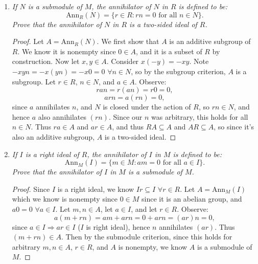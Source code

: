 \documentclass[9pt,reqno,twoside]{amsbook}
\theoremstyle{plain}
\numberwithin{section}{chapter}
\numberwithin{equation}{chapter}
\theoremstyle{definition}
\theoremstyle{remark}
\theoremstyle{plain}
\newcommand{\sub}{\subseteq}
\begin{document}
\begin{enumerate}[label=\arabic*.]
\begin{enumerate}
\vspace{3mm}
\item \textit{If $R$ has zero divisors, show that every nonzero $R$-module has nonzero torsion elements. }

\begin{proof}
Suppose $R$ has zero divisors. So $\exists r,s \in R$ nonzero such that $rs = 0$. Now let $M$ be an $R$-module. We wish to show that $\exists m \in M$ s.t. $m \neq 0$, $tm = 0$ for some nonzero $t \in R$. Let $n \in M$ s.t. $n \neq 0$. Now consider $sn \in M$ and $r \in R$. Now note that $rsn = 0$ and that $r$ and $sn$ are both nonzero, so $sn$ is a nonzero torsion element. 
\end{proof}
\end{enumerate}
\vspace{3mm}
\item \textit{If $N$ is a submodule of $M$, the annihilator of $N$ in $R$ is defined to be: 
$$
\text{Ann}_R(N) = \{r \in R:rn = 0 \text{ for all }n \in N\}.
$$
Prove that the annihilator of $N$ in $R$ is a two-sided ideal of $R$. 
}

\begin{proof}
Let $A = \text{Ann}_R(N)$. We first show that $A$ is an additive subgroup of $R$. We know it is nonempty since $0 \in A$, and it is a subset of $R$ by construction. Now let $x,y \in A$. Consider $x(-y) = -xy$. Note $-xyn = -x(yn) = -x0 = 0$ $\forall n \in N$, so by the subgroup criterion, $A$ is a subgroup. Let $r \in R$, $n \in N$, and $a \in A$. Observe:
$$
ran = r(an) = r0 = 0,
$$
$$
arn = a(rn) = 0,
$$
since $a$ annihilates $n$, and $N$ is closed under the action of $R$, so $rn \in N$, and hence $a$ also annihilates $(rn)$. Since our $n$ was arbitrary, this holds for all $n \in N$. Thus $ra \in A$ and $ar \in A$, and thus $RA \sub A$ and $AR \sub A$, so since it's also an additive subgroup, $A$ is a two-sided ideal. 
\end{proof}

\vspace{3mm}

\item \textit{If $I$ is a right ideal of $R$, the annihilator of $I$ in $M$ is defined to be: 
$$
\text{Ann}_M(I) = \{m \in M:am = 0 \text{ for all }a \in I\}.
$$
Prove that the annihilator of $I$ in $M$ is a submodule of $M$. 
}
\begin{proof}
Since $I$ is a right ideal, we know $Ir \sub I$ $\forall r \in R$. Let $A = \text{Ann}_M(I)$ which we know is nonempty since $0 \in M$ since it is an abelian group, and $a0 = 0$ $\forall a \in I$. Let $m,n \in A$, let $a \in I$, and let $r \in R$. Observe: 
$$
a(m + rn) = am + arn = 0 + arn = (ar)n = 0,
$$
since $a \in I \Rightarrow ar \in I$ ($I$ is right ideal), hence $n$ annihilates $(ar)$. Thus $(m + rn) \in A$. Then by the submodule criterion, since this holds for arbitrary $m,n  \in A$, $r \in R$, and $A$ is nonempty, we know $A$ is a submodule of $M$. 
\end{proof}


\end{enumerate}
\end{document}
